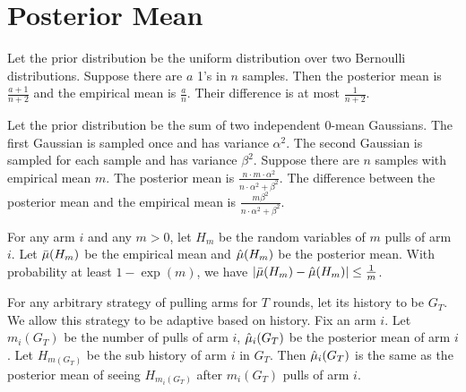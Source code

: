 \section{Posterior Mean}

\begin{example}
Let the prior distribution be the uniform distribution over two Bernoulli distributions. Suppose there are $a$ 1's in $n$ samples. Then the posterior mean is $\frac{a+1}{n+2}$ and the empirical mean is $\frac{a}{n}$. Their difference is at most $\frac{1}{n+2}$. 
\end{example}

\begin{example}
Let the prior distribution be the sum of two independent 0-mean Gaussians. The first Gaussian is sampled once and has variance $\alpha^2$. The second Gaussian is sampled for each sample and has variance $\beta^2$. Suppose there are $n$ samples with empirical mean $m$. The posterior mean is $\frac{n \cdot m \cdot \alpha^2}{n \cdot \alpha^2 + \beta^2}$. The difference between the posterior mean and the empirical mean is $\frac{m\beta^2}{n\cdot \alpha^2 + \beta^2}$.
\end{example}

\begin{assumption}
\label{ass:post}
For any arm $i$ and any $m >0$, let $H_m$ be the random variables of $m$ pulls of arm $i$. Let $\bar{\mu}(H_m)$ be the empirical mean and $\hat{\mu}(H_m)$ be the posterior mean. With probability at least $1 - \exp(m)$, we have $|\bar{\mu}(H_m) - \hat{\mu}(H_m)| \leq \frac{1}{m}$. 
\end{assumption}

\begin{lemma}
\label{lem:post}
For any arbitrary strategy of pulling arms for $T$ rounds, let its history to be $G_T$. We allow this strategy to be adaptive based on history. Fix an arm $i$. Let $m_i(G_T)$ be the number of pulls of arm $i$, $\hat{\mu}_i(G_T)$ be the posterior mean of arm $i$. Let $H_{m(G_T)}$ be the sub history of arm $i$ in $G_T$. Then $\hat{\mu}_i(G_T)$ is the same as the posterior mean of seeing $H_{m_i(G_T)}$ after $m_i(G_T)$ pulls of arm $i$.
\end{lemma}

